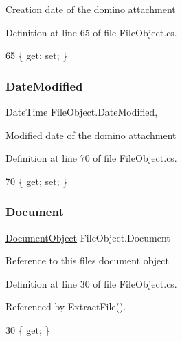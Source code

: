 Creation date of the domino attachment 



Definition at line 65 of file File\+Object.\+cs.


\begin{DoxyCode}
65 \{ \textcolor{keyword}{get}; \textcolor{keyword}{set}; \}
\end{DoxyCode}
\mbox{\label{class_file_object_a9a4c52e205bee3f8bdfa7040f465b6af}} 
\subsubsection{\texorpdfstring{Date\+Modified}{DateModified}}
{\footnotesize\ttfamily Date\+Time File\+Object.\+Date\+Modified\hspace{0.3cm}{\ttfamily [get]}, {\ttfamily [set]}}



Modified date of the domino attachment 



Definition at line 70 of file File\+Object.\+cs.


\begin{DoxyCode}
70 \{ \textcolor{keyword}{get}; \textcolor{keyword}{set}; \}
\end{DoxyCode}
\mbox{\label{class_file_object_a0c9650a6ae1efb95f8211f9fa3b883fe}} 
\subsubsection{\texorpdfstring{Document}{Document}}
{\footnotesize\ttfamily \mbox{\hyperlink{class_document_object}{Document\+Object}} File\+Object.\+Document\hspace{0.3cm}{\ttfamily [get]}}



Reference to this files document object 



Definition at line 30 of file File\+Object.\+cs.



Referenced by Extract\+File().


\begin{DoxyCode}
30 \{ \textcolor{keyword}{get}; \}
\end{DoxyCode}
\mbox{\label{class_file_object_ae25b58dc19def323da91a48e17ba13ed}} 
